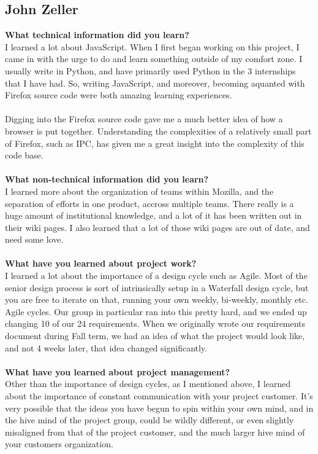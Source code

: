 \documentclass[12pt]{article}
\begin{document}
\subsection{John Zeller}
\textbf{What technical information did you learn?}\\
I learned a lot about JavaScript. When I first began working on this project, I came in with the urge to do and learn something outside of my comfort zone. I usually write in Python, and have primarily used Python in the 3 internships that I have had. So, writing JavaScript, and moreover, becoming aquanted with Firefox source code were both amazing learning experiences.
\\\\
Digging into the Firefox source code gave me a much better idea of how a browser is put together. Understanding the complexities of a relatively small part of Firefox, such as IPC, has given me a great insight into the complexity of this code base.
\\\\
\textbf{What non-technical information did you learn?}\\
I learned more about the organization of teams within Mozilla, and the separation of efforts in one product, accross multiple teams. There really is a huge amount of institutional knowledge, and a lot of it has been written out in their wiki pages. I also learned that a lot of those wiki pages are out of date, and need some love.
\\\\
\textbf{What have you learned about project work?}\\
I learned a lot about the importance of a design cycle such as Agile. Most of the senior design process is sort of intrinsically setup in a Waterfall design cycle, but you are free to iterate on that, running your own weekly, bi-weekly, monthly etc. Agile cycles. Our group in particular ran into this pretty hard, and we ended up changing 10 of our 24 requirements. When we originally wrote our requirements document during Fall term, we had an idea of what the project would look like, and not 4 weeks later, that idea changed significantly.
\\\\
\textbf{What have you learned about project management?}\\
Other than the importance of design cycles, as I mentioned above, I learned about the importance of constant communication with your project customer. It's very possible that the ideas you have begun to spin within your own mind, and in the hive mind of the project group, could be wildly different, or even slightly misaligned from that of the project customer, and the much larger hive mind of your customers organization. 
\end{document}
